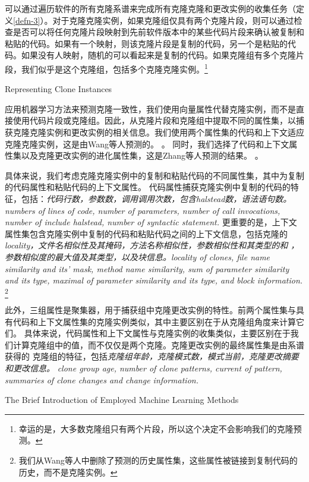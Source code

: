 可以通过遍历软件的所有克隆系谱来完成所有克隆克隆和更改实例的收集任务（定义\ref {defn-3}）。对于克隆克隆实例，如果克隆组仅具有两个克隆片段，则可以通过检查是否可以将任何克隆片段映射到先前软件版本中的某些代码片段来确认被复制和粘贴的代码。如果有一个映射，则该克隆片段是复制的代码，另一个是粘贴的代码。如果没有人映射，随机的可以看起来是复制的代码。如果克隆组有多个克隆片段，我们似乎是这个克隆组，包括多个克隆克隆实例。\footnote{幸运的是，大多数克隆组只有两个片段，所以这个决定不会影响我们的克隆预测。}

{Representing Clone Instances}

应用机器学习方法来预测克隆一致性，我们使用向量属性代替克隆实例，而不是直接使用代码片段或克隆组。因此，从克隆片段和克隆组中提取不同的属性集，以捕获克隆克隆实例和更改实例的相关信息。我们使用两个属性集的代码和上下文适应克隆克隆实例，这是由Wang等人预测的。 \cite{wang2014predicting}。
同时，我们选择了代码和上下文属性集以及克隆更改实例的进化属性集，这是Zhang等人预测的结果。 \cite{zhang2016predicting}。

具体来说，我们考虑克隆克隆实例中的复制和粘贴代码的不同属性集，其中为复制的代码属性和粘贴代码的上下文属性。
代码属性捕获克隆实例中复制的代码的特征，包括：{\em 代码行数，参数数，调用调用次数，包含halstead数，语法语句数。}
{\em numbers of lines of code, number of parameters, number of call invocations, number of include halstead, number of syntactic statement.}
更重要的是，上下文属性集包含克隆实例中复制的代码和粘贴代码之间的上下文信息，包括克隆的{\em locality，文件名相似性及其掩码，方法名称相似性，参数相似性和其类型的和 ，参数相似度的最大值及其类型，以及块信息。}{\em locality of clones, file name similarity and its' mask, method name similarity, sum of parameter similarity and its type, maximal of parameter similarity and its type, and block information.} \footnote{我们从Wang等人中删除了预测的历史属性集，这些属性被链接到复制代码的历史，而不是克隆实例。}

此外，三组属性是聚集器，用于捕获组中克隆更改实例的特性。前两个属性集与具有代码和上下文属性集的克隆实例类似，其中主要区别在于从克隆组角度来计算它们。
具体来说，代码属性和上下文属性与克隆实例的收集类似，主要区别在于我们计算克隆组中的值，而不仅仅是两个克隆。克隆更改实例的最终属性集是由系谱获得的
克隆组的特征，包括{\em 克隆组年龄，克隆模式数，模式当前，克隆更改摘要和更改信息。}
{\em clone group age, number of clone patterns, current of pattern, summaries of clone changes and change information.}



{The Brief Introduction of Employed Machine Learning Methods}



